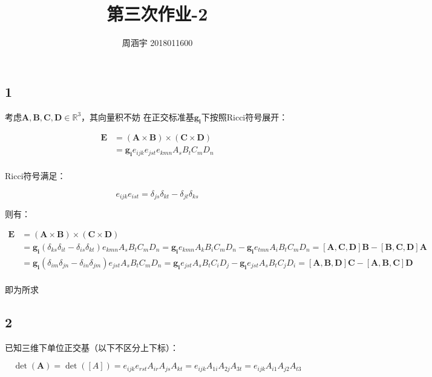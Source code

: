 \documentclass[UTF8,zihao=5]{ctexart}
\title{{\bfseries 第三次作业-2}}
\author{周涵宇 2018011600}
\date{}
\begin{document}
\maketitle

\subsection*{1}

考虑$\bm{A,B,C,D}\in\mathbb{R}^3$，其向量积不妨
在正交标准基$\bm{g_i}$下按照Ricci符号展开：

\begin{equation*}
    \begin{split}
        \bm{E}&=\bm{(A\times B)\times(C\times D)}\\
        &=\bm{g_i}e_{ijk}e_{jst}e_{kmn}A_sB_tC_mD_n\\
    \end{split}
\end{equation*}

Ricci符号满足：

\begin{equation*}
    e_{ijk}e_{ist}=\delta_{js}\delta_{kt}-\delta_{jt}\delta_{ks}
\end{equation*}

则有：

\begin{equation*}
    \begin{split}
        \bm{E}&=\bm{(A\times B)\times(C\times D)}\\
        &=\bm{g_i}(\delta_{ks}\delta_{it}-\delta_{is}\delta_{kt})e_{kmn}A_sB_tC_mD_n
        =\bm{g_i}e_{kmn}A_kB_iC_mD_n-\bm{g_i}e_{tmn}A_iB_tC_mD_n
        =\bm{[A,C,D]B}-\bm{[B,C,D]A}\\
        &=\bm{g_i}(\delta_{im}\delta_{jn}-\delta_{in}\delta_{jm})e_{jst}A_sB_tC_mD_n
        =\bm{g_i}e_{jst}A_sB_tC_iD_j-\bm{g_i}e_{jst}A_sB_tC_jD_i
        =\bm{[A,B,D]C}-\bm{[A,B,C]D}\\
    \end{split}
\end{equation*}

即为所求

\subsection*{2}

已知三维下单位正交基（以下不区分上下标）：

$$
\det(\bm{A})=\det([A])=e_{ijk}e_{rst}A_{ir}A_{js}A_{kt}
=e_{ijk}A_{1i}A_{2j}A_{3t}=e_{ijk}A_{i1}A_{j2}A_{t3}
$$
\end{document}
